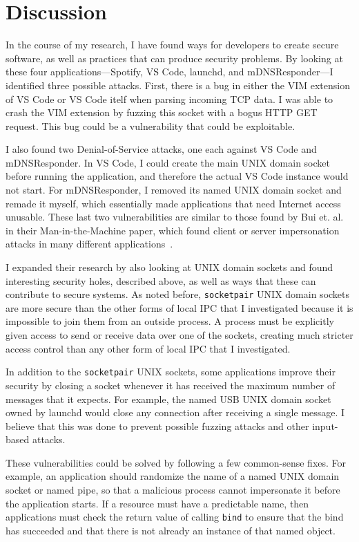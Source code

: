\chapter{Discussion}
\label{sec:discussion}
In the course of my research, I have found ways for developers to create secure software, as well as practices that can produce security problems.  By looking at these four applications---Spotify, VS Code, launchd, and mDNSResponder---I identified three possible attacks.  First, there is a bug in either the VIM extension of VS Code or VS Code itelf when parsing incoming TCP data.  I was able to crash the VIM extension by fuzzing this socket with a bogus HTTP GET request.  This bug could be a vulnerability that could be exploitable.

I also found two Denial-of-Service attacks, one each against VS Code and mDNSResponder.  In VS Code, I could create the main UNIX domain socket before running the application, and therefore the actual VS Code instance would not start.  For mDNSResponder, I removed its named UNIX domain socket and remade it myself, which essentially made applications that need Internet access unusable.  These last two vulnerabilities are similar to those found by Bui et. al. in their Man-in-the-Machine paper, which found client or server impersonation attacks in many different applications~\cite{MitMa}.

I expanded their research by also looking at UNIX domain sockets and found interesting security holes, described above, as well as ways that these can contribute to secure systems.  As noted before, \texttt{socketpair} UNIX domain sockets are more secure than the other forms of local IPC that I investigated because it is impossible to join them from an outside process.  A process must be explicitly given access to send or receive data over one of the sockets, creating much stricter access control than any other form of local IPC that I investigated.

In addition to the \texttt{socketpair} UNIX sockets, some applications improve their security by closing a socket whenever it has received the maximum number of messages that it expects.  For example, the named USB UNIX domain socket owned by launchd would close any connection after receiving a single message.  I believe that this was done to prevent possible fuzzing attacks and other input-based attacks.

These vulnerabilities could be solved by following a few common-sense fixes.  For example, an application should randomize the name of a named UNIX domain socket or named pipe, so that a malicious process cannot impersonate it before the application starts.  If a resource must have a predictable name, then applications must check the return value of calling \texttt{bind} to ensure that the bind has succeeded and that there is not already an instance of that named object.

